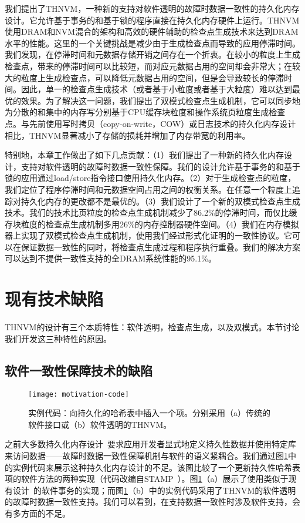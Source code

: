 我们提出了THNVM，一种新的支持对软件透明的故障时数据一致性的持久化内存设计。它允许基于事务的和基于锁的程序直接在持久化内存硬件上运行。THNVM使用DRAM和NVM混合的架构和高效的硬件辅助的检查点生成技术来达到DRAM水平的性能。这里的一个关键挑战是减少由于生成检查点而导致的应用停滞时间。我们发现，在停滞时间和元数据存储开销之间存在一个折衷。在较小的粒度上生成检查点，带来的停滞时间可以比较短，而对应元数据占用的空间却会非常大；在较大的粒度上生成检查点，可以降低元数据占用的空间，但是会导致较长的停滞时间。因此，单一的检查点生成技术（或者基于小粒度或者基于大粒度）难以达到最优的效果。为了解决这一问题，我们提出了双模式检查点生成机制，它可以同步地为分散的和集中的内存写分别基于CPU缓存块粒度和操作系统页粒度生成检查点。与先前使用写时拷贝（copy-on-write，COW）或日志技术的持久化内存设计相比，THNVM显著减小了存储的损耗并增加了内存带宽的利用率。

特别地，本章工作做出了如下几点贡献：（1）我们提出了一种新的持久化内存设计，支持对软件透明的故障时数据一致性保障。我们的设计允许基于事务的和基于锁的应用通过load/store指令接口使用持久化内存。（2）对于生成检查点的粒度，我们定位了程序停滞时间和元数据空间占用之间的权衡关系。在任意一个粒度上追踪对持久化内存的更改都不是最优的。（3）我们设计了一个新的双模式检查点生成技术。我们的技术比页粒度的检查点生成机制减少了86.2\%的停滞时间，而仅比缓存块粒度的检查点生成机制多用26\%的内存控制器硬件空间。（4）我们在内存模拟器上实现了双模式检查点生成机制，使用我们经过形式化证明的一致性协议。它可以在保证数据一致性的同时，将检查点生成过程和程序执行重叠。我们的解决方案可以达到不提供一致性支持的全DRAM系统性能的95.1\%。

\section{现有技术缺陷}

THNVM的设计有三个本质特性：软件透明，检查点生成，以及双模式。本节讨论我们开发这三种特性的原因。

\subsection{软件一致性保障技术的缺陷}

\begin{figure}[!h]
\centering \texttt{[image: motivation-code]}
  \caption{实例代码：向持久化的哈希表中插入一个项。分别采用（a）传统的软件接口或（b）软件透明的THNVM。}
\label{fig:motivation-code}
\end{figure}

之前大多数持久化内存设计~\cite{Condit:2009:BIT:1629575.1629589,Volos:2011:MLP:1950365.1950379,Coburn:2011:NMP:1950365.1950380,Zhao:2013:KCP:2540708.2540744,Venkataraman:2011:CDD:1960475.1960480}要求应用开发者显式地定义持久性数据并使用特定库来访问数据——故障时数据一致性保障机制与软件的语义紧耦合。我们通过图\ref{fig:motivation-code}中的实例代码来展示这种持久化内存设计的不足。该图比较了一个更新持久性哈希表项的软件方法的两种实现（代码改编自STAMP~\cite{Cao:2008:STA}）。图\ref{fig:motivation-code}（a）展示了使用类似于现有设计~\cite{Condit:2009:BIT:1629575.1629589, Volos:2011:MLP:1950365.1950379}的软件事务的实现；而图\ref{fig:motivation-code}（b）中的实例代码采用了THNVM的软件透明的故障时数据一致性支持。我们可以看到，在支持数据一致性时涉及软件支持，会有多方面的不足。

